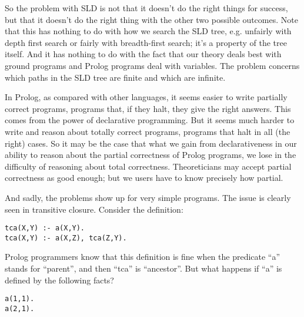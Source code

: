 So the problem with SLD is not that it doesn't do the right things for
success, but that it doesn't do the right thing with the other two
possible outcomes.  Note that this has nothing to do with how we
search the SLD tree, e.g. unfairly with depth first search or fairly
with breadth-first search; it's a property of the tree itself.  And it
has nothing to do with the fact that our theory deals best with ground
programs and Prolog programs deal with variables.  The problem
concerns which paths in the SLD tree are finite and which are
infinite.

In Prolog, as compared with other languages, it seems easier to write
partially correct programs, programs that, if they halt, they give the
right answers.  This comes from the power of declarative programming.
But it seems much harder to write and reason about totally correct
programs, programs that halt in all (the right) cases.  So it may be
the case that what we gain from declarativeness in our ability to
reason about the partial correctness of Prolog programs, we lose in
the difficulty of reasoning about total correctness.  Theoreticians
may accept partial correctness as good enough; but we users have to
know precisely how partial.

And sadly, the problems show up for very simple programs.  The issue
is clearly seen in transitive closure.  Consider the definition:

\begin{verbatim}
tca(X,Y) :- a(X,Y).
tca(X,Y) :- a(X,Z), tca(Z,Y).
\end{verbatim}

Prolog programmers know that this definition is fine when the
predicate ``a'' stands for ``parent'', and then ``tca'' is
``ancestor''.  But what happens if ``a'' is defined by the following
facts?

\begin{verbatim}
a(1,1).
a(2,1).
\end{verbatim}

